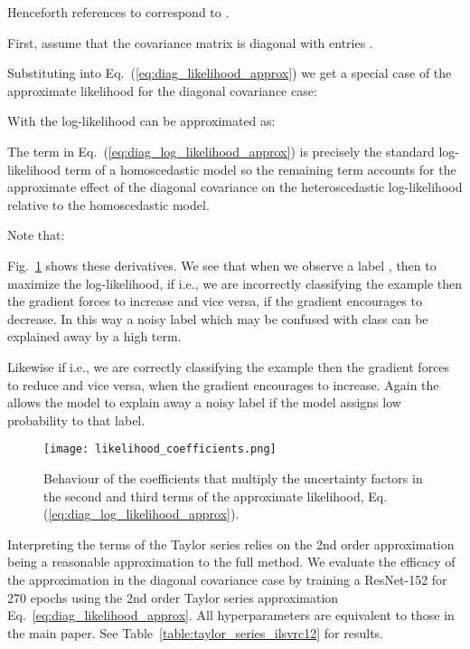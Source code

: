 \documentclass[final]{cvpr}
\begin{document}
Henceforth references to  correspond to .

First, assume that the covariance matrix  is diagonal with entries .

Substituting into Eq.~(\ref{eq:diag_likelihood_approx}) we get a special case of the approximate likelihood for the diagonal covariance case:



With  the log-likelihood can be approximated as:



The  term in Eq.~(\ref{eq:diag_log_likelihood_approx}) is precisely the standard log-likelihood term of a homoscedastic model so the remaining  term accounts for the approximate effect of the diagonal covariance on the heteroscedastic log-likelihood relative to the homoscedastic model.

Note that:





Fig.\ \ref{fig:likelihood_coefs} shows these derivatives. We see that when we observe a label , then to maximize the log-likelihood, if  i.e., we are incorrectly classifying the example then the gradient forces  to increase and vice versa, if  the gradient encourages  to decrease. In this way a noisy label  which may be confused with class  can be explained away by a high  term.

Likewise if  i.e., we are correctly classifying the example then the gradient forces  to reduce and vice versa, when  the gradient encourages  to increase. Again the  allows the model to explain away a noisy label  if the model assigns low probability to that label.

\begin{figure}
    \centering
    \texttt{[image: likelihood\_coefficients.png]}
    \caption{Behaviour of the coefficients that multiply the uncertainty factors in the second and third terms of the approximate likelihood, Eq. (\ref{eq:diag_log_likelihood_approx}).}
    \label{fig:likelihood_coefs}
\end{figure}

Interpreting the terms of the Taylor series relies on the 2nd order approximation being a reasonable approximation to the full method. We evaluate the efficacy of the approximation in the diagonal covariance case by training a ResNet-152 for 270 epochs using the 2nd order Taylor series approximation Eq.~\ref{eq:diag_likelihood_approx}. All hyperparameters are equivalent to those in the main paper. See Table~\ref{table:taylor_series_ilsvrc12} for results.
\end{document}
